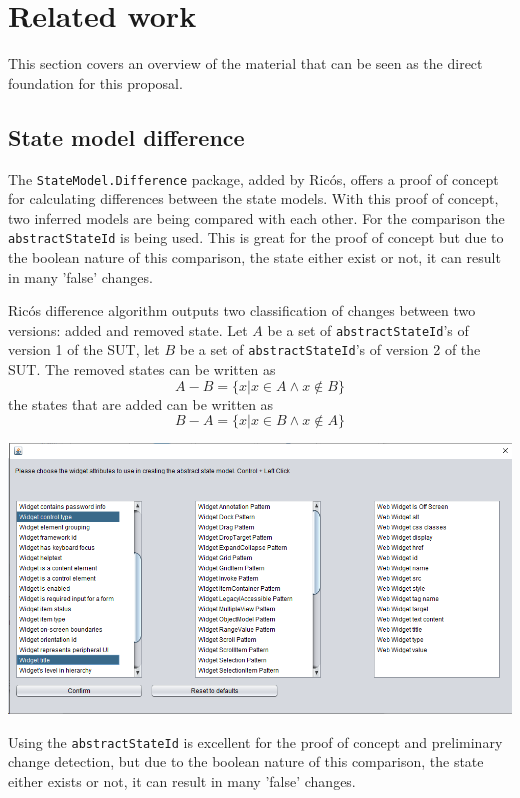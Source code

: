 \section{Related work} \label{releatedWork}
    
This section covers an overview of the material that can be seen as the direct foundation for this proposal.

\subsection{State model difference}
The \verb|StateModel.Difference| package, added by Ricós\cite{stateDiff}, offers a proof of concept for calculating differences between the state models. With this proof of concept, two inferred models are being compared with each other. For the comparison the \verb|abstractStateId| is being used. This is great for the proof of concept but due to the boolean nature of this comparison, the state either exist or not, it can result in many 'false' changes. 



Ricós difference algorithm\cite{stateDiff} outputs two classification of changes between two versions: added and removed state. Let $A$ be a set of \verb|abstractStateId|'s of version 1 of the SUT, let $B$ be a set of \verb|abstractStateId|'s of version 2 of the SUT. The removed states can be written as
\[A-B = \lbrace x | x \in A \wedge x \notin B \rbrace\]
the states that are added can be written as
\[B-A = \lbrace x | x \in B \wedge x \notin A \rbrace\]

\begingroup
\captionsetup{type=figure}
\includegraphics[scale=0.5]{pics/attributes-state-model.png}
\label{fig:advance}
\endgroup

Using the \verb|abstractStateId| is excellent for the proof of concept and preliminary change detection, but due to the boolean nature of this comparison, the state either exists or not, it can result in many 'false' changes.

